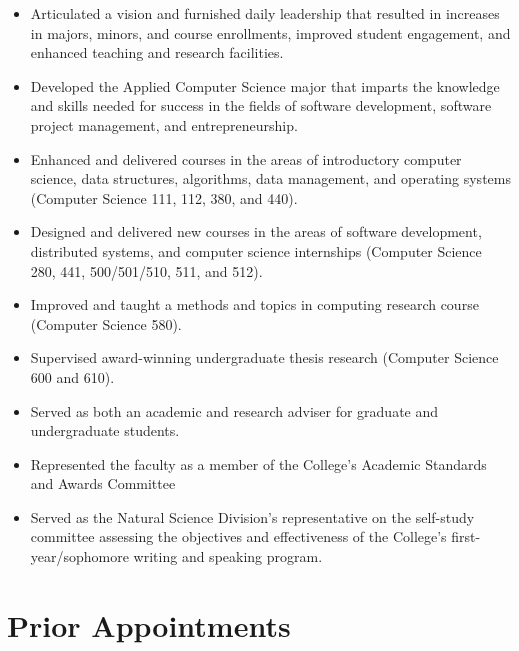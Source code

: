\documentclass[11pt,letterpaper,sans]{moderncv/moderncv}
\begin{document}
{\begin{itemize}
    \renewcommand\labelitemi{\Large\textbullet}
    \item Articulated a vision and furnished daily leadership that resulted in increases in majors, minors, and
      course enrollments, improved student engagement, and enhanced teaching and research facilities.
    \item Developed the Applied Computer Science major that imparts the knowledge and skills needed for success in the
      fields of software development, software project management, and entrepreneurship.
    \item Enhanced and delivered courses in the areas of introductory computer science, data structures,
      algorithms, data management, and operating systems (Computer Science 111, 112, 380, and 440).
    \item Designed and delivered new courses in the areas of software development, distributed systems, and computer
      science internships (Computer Science 280, 441, 500/501/510, 511, and 512).
    \item Improved and taught a methods and topics in computing research course (Computer Science
        580).
    \item Supervised award-winning undergraduate thesis research (Computer Science 600 and 610).
    \item Served as both an academic and research adviser for graduate and undergraduate students.
    \item Represented the faculty as a member of the College's Academic Standards and Awards Committee
    \item Served as the Natural Science Division's representative on the self-study committee assessing the
    objectives and effectiveness of the College's first-year/sophomore writing and speaking program.
  \end{itemize}}


\vspace*{-.1in}
\section{Prior Appointments}
\end{document}
